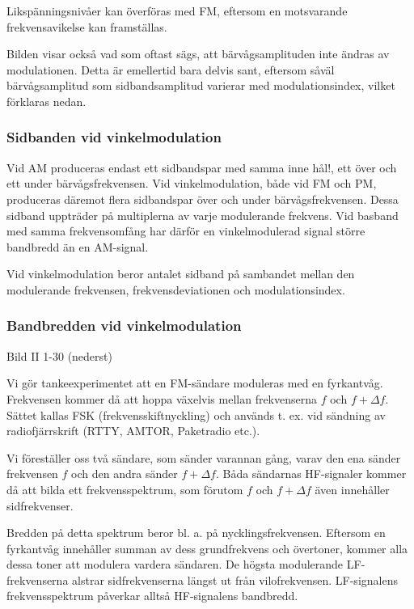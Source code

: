 \documentclass[a4paper,twoside,twocolumn,openright]{book}
\begin{document}
Likspänningsnivåer kan överföras med FM, eftersom en motsvarande frekvensavikelse kan
framställas.

Bilden visar också vad som oftast sägs, att bärvågsamplituden inte ändras av modulationen.
Detta är emellertid bara delvis sant, eftersom såväl bärvågsamplitud som sidbandsamplitud
varierar med modulationsindex, vilket förklaras nedan.

\subsubsection{Sidbanden vid vinkelmodulation}

Vid AM produceras endast ett sidbandspar med samma inne hål!, ett över och ett under
bärvågsfrekvensen. Vid vinkelmodulation, både vid FM och PM, produceras däremot flera
sidbandspar över och under bärvågsfrekvensen. Dessa sidband uppträder på multiplerna av
varje modulerande frekvens. Vid basband med samma frekvensomfång har därför en
vinkelmodulerad signal större bandbredd än en AM-signal.

Vid vinkelmodulation beror antalet sidband på sambandet mellan den modulerande frekvensen,
frekvensdeviationen och modulationsindex.

\subsubsection{Bandbredden vid vinkelmodulation}

Bild II 1-30 (nederst)

Vi gör tankeexperimentet att en FM-sändare moduleras med en fyrkantvåg. Frekvensen
kommer då att hoppa växelvis mellan frekvenserna $f$ och $f + \Delta f$. Sättet kallas FSK
(frekvensskiftnyckling) och används t. ex. vid sändning av radiofjärrskrift (RTTY, AMTOR,
Paketradio etc.).

Vi föreställer oss två sändare, som sänder varannan gång, varav den ena sänder frekvensen
$f$ och den andra sänder $f + \Delta f$. Båda sändarnas HF-signaler kommer då att bilda
ett frekvensspektrum, som förutom $f$ och $f + \Delta f$ även innehåller sidfrekvenser.

Bredden på detta spektrum beror bl. a. på nycklingsfrekvensen. Eftersom en fyrkantvåg
innehåller summan av dess grundfrekvens och övertoner, kommer alla dessa toner att
modulera vardera sändaren. De högsta modulerande LF-frekvenserna alstrar sidfrekvenserna
längst ut från vilofrekvensen. LF-signalens frekvensspektrum påverkar alltså
HF-signalens bandbredd.
\end{document}

